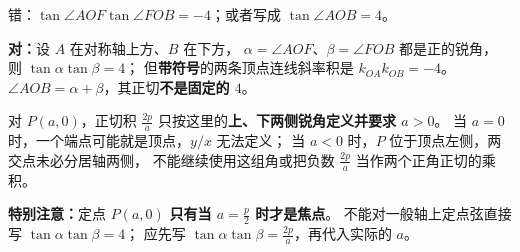 \clearpage
\begin{trapbox}
\begin{description}[style=nextline,leftmargin=2.8em,labelsep=0.5em,itemsep=0.6em]
\item[\textbf{\textcolor{CTrap}{陷阱 9｜把张角正切积的正负号混为一谈}}]
错：$\tan\angle AOF\tan\angle FOB=-4$；或者写成 $\tan\angle AOB=4$。\par
\textbf{对：}设 $A$ 在对称轴上方、$B$ 在下方，
$\alpha=\angle AOF$、$\beta=\angle FOB$ 都是正的锐角，
则 $\boxed{\tan\alpha\tan\beta=4}$；
但\textbf{带符号}的两条顶点连线斜率积是 $\boxed{k_{OA}k_{OB}=-4}$。
$\angle AOB=\alpha+\beta$，其正切\textbf{不是固定的 $4$}。

\item[\textbf{\textcolor{CTrap}{陷阱 10｜忘记轴上定点 $a>0$ 与焦点特例}}]
对 $P(a,0)$，正切积 $\frac{2p}{a}$ 只按这里的\textbf{上、下两侧锐角定义并要求 $a>0$}。
当 $a=0$ 时，一个端点可能就是顶点，$y/x$ 无法定义；
当 $a<0$ 时，$P$ 位于顶点左侧，两交点未必分居轴两侧，
不能继续使用这组角或把负数 $\frac{2p}{a}$ 当作两个正角正切的乘积。\par
\textbf{特别注意：}定点 $P(a,0)$ \textbf{只有当 $a=\frac p2$ 时才是焦点}。
不能对一般轴上定点弦直接写 $\tan\alpha\tan\beta=4$；
应先写 $\boxed{\tan\alpha\tan\beta=\frac{2p}{a}}$，再代入实际的 $a$。
\end{description}
\end{trapbox}
